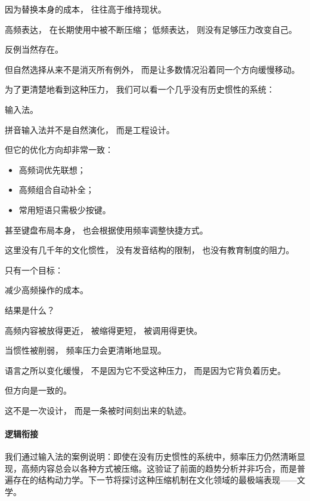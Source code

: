 \documentclass[../main.tex]{subfiles}
\begin{document}
因为替换本身的成本，
往往高于维持现状。

高频表达，
在长期使用中被不断压缩；
低频表达，
则没有足够压力改变自己。

反例当然存在。

但自然选择从来不是消灭所有例外，
而是让多数情况沿着同一个方向缓慢移动。

\vspace{0.5em}

为了更清楚地看到这种压力，
我们可以看一个几乎没有历史惯性的系统：

输入法。

拼音输入法并不是自然演化，
而是工程设计。

但它的优化方向却非常一致：

\begin{itemize}
	\item 高频词优先联想；
	\item 高频组合自动补全；
	\item 常用短语只需极少按键。
\end{itemize}

甚至键盘布局本身，
也会根据使用频率调整快捷方式。

这里没有几千年的文化惯性，
没有发音结构的限制，
也没有教育制度的阻力。

只有一个目标：

减少高频操作的成本。

结果是什么？

高频内容被放得更近，
被缩得更短，
被调用得更快。

\begin{readingnote}
	当惯性被削弱，
	频率压力会更清晰地显现。
\end{readingnote}

语言之所以变化缓慢，
不是因为它不受这种压力，
而是因为它背负着历史。

但方向是一致的。

这不是一次设计，
而是一条被时间刻出来的轨迹。

\paragraph*{逻辑衔接}
我们通过输入法的案例说明：即使在没有历史惯性的系统中，频率压力仍然清晰显现，高频内容总会以各种方式被压缩。这验证了前面的趋势分析并非巧合，而是普遍存在的结构动力学。下一节将探讨这种压缩机制在文化领域的最极端表现——文学。

\end{document}
